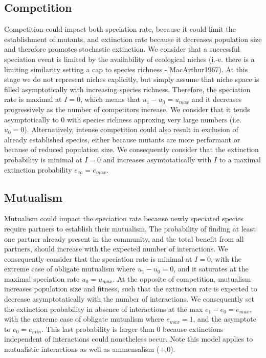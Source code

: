 \documentclass[12pt]{article}
\begin{document}
\subsection*{Competition}

Competition could impact both speciation rate, because it could limit the
establishment of mutants, and extinction rate because it decreases population
size and therefore promotes stochastic extinction. We consider that a
successful speciation event is limited by the availability of ecological
niches (i.-e. there is a limiting similarity setting a cap to species richness
- MacArthur1967). At this stage we do not represent niches explicitly, but
simply assume that niche space is filled asymptotically with increasing
species richness. Therefore, the speciation rate is maximal at $I = 0$, which
means that $u_1-u_0 = u_{max}$ and it decreases progressively as the number of
competitors increase. We consider that it tends asymptotically to 0 with
species richness approxing very large numbers (i.e. $u_0 = 0$). Alternatively,
intense competition could also result in exclusion of already established
species, either because mutants are more performant or because of reduced
population size. We consequently consider that the extinction probability is
minimal at $I = 0$ and increases asymtotatically with $I$ to a maximal
extinction probability $e_{\infty} = e_{max}$.

\subsection*{Mutualism}

Mutualism could impact the speciation rate because newly speciated species
require partners to establish their mutualism. The probability of finding at
least one partner already present in the community, and the total benefit from
all partners, should increase with the expected number of interactions. We
consequently consider that the speciation rate is minimal at $I = 0$, with the
extreme case of obligate mutualism where $u_1-u_0 = 0$, and it saturates at
the maximal speciation rate $u_0 = u_{max}$. At the opposite of competition,
mutualism increases population size and fitness, such that the extinction rate
is expected to decrease asymptotatically with the number of interactions. We
consequently set the extinction probability in absence of interactions at the
max $e_1-e_0 = e_{max}$, with the extreme case of obligate mutualism where
$e_{max}=1$, and the asymptote to $e_0 = e_{min}$. This last probability is
larger than 0 because extinctions independent of interactions could
nonetheless occur. Note this model applies to mutualistic interactions as well
as ammensalism (+,0).
\end{document}
